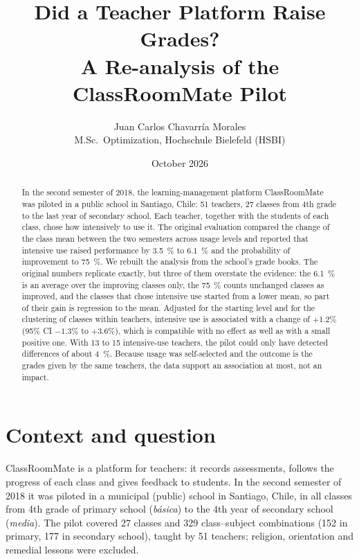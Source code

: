 \documentclass[11pt,a4paper]{article}
\title{Did a Teacher Platform Raise Grades?\\ A Re-analysis of the ClassRoomMate Pilot}
\author{Juan Carlos Chavarr\'ia Morales\\[2pt]
  \small M.Sc.\ Optimization, Hochschule Bielefeld (HSBI)}
\date{October 2026}
\begin{document}
\maketitle

\begin{abstract}
In the second semester of 2018, the learning-management platform ClassRoomMate was piloted in a public school in
Santiago, Chile: 51 teachers, 27 classes from 4th grade to the last year of secondary school. Each teacher, together
with the students of each class, chose how intensively to use it. The original evaluation compared the change of the
class mean between the two semesters across usage levels and reported that intensive use raised performance by
\SI{3.5}{\percent} to \SI{6.1}{\percent} and the probability of improvement to \SI{75}{\percent}. We rebuilt the
analysis from the school's grade books. The original numbers replicate exactly, but three of them overstate the
evidence: the \SI{6.1}{\percent} is an average over the improving classes only, the \SI{75}{\percent} counts
unchanged classes as improved, and the classes that chose intensive use started from a lower mean, so part of their
gain is regression to the mean. Adjusted for the starting level and for the clustering of classes within teachers,
intensive use is associated with a change of $+1.2\%$ (95\% CI $-1.3\%$ to $+3.6\%$), which is compatible with
no effect as well as with a small positive one. With 13 to 15 intensive-use teachers, the pilot could only have
detected differences of about \SI{4}{\percent}. Because usage was self-selected and the outcome is the grades given
by the same teachers, the data support an association at most, not an impact.
\end{abstract}

\section{Context and question}

ClassRoomMate is a platform for teachers: it records assessments, follows the progress of each class and gives
feedback to students. In the second semester of 2018 it was piloted in a municipal (public) school in Santiago, Chile,
in all classes from 4th grade of primary school (\emph{básica}) to the 4th year of secondary school (\emph{media}).
The pilot covered 27 classes and 329 class--subject combinations (152 in primary, 177 in secondary school), taught by
51 teachers; religion, orientation and remedial lessons were excluded.
\end{document}
